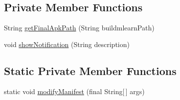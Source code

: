 \subsection*{Private Member Functions}
\begin{DoxyCompactItemize}
\item 
String \hyperlink{classorg_1_1buildmlearn_1_1toolkit_1_1utilities_1_1SignerThread_aff414424065d68592040cd946dd0122e}{get\+Final\+Apk\+Path} (String buildmlearn\+Path)
\item 
void \hyperlink{classorg_1_1buildmlearn_1_1toolkit_1_1utilities_1_1SignerThread_add7546ba257b1319a0e90451333b81e1}{show\+Notification} (String description)
\end{DoxyCompactItemize}
\subsection*{Static Private Member Functions}
\begin{DoxyCompactItemize}
\item 
static void \hyperlink{classorg_1_1buildmlearn_1_1toolkit_1_1utilities_1_1SignerThread_a9873f5f2abdf3d92a9684290509bc16f}{modify\+Manifest} (final String\mbox{[}$\,$\mbox{]} args)
\end{DoxyCompactItemize}
